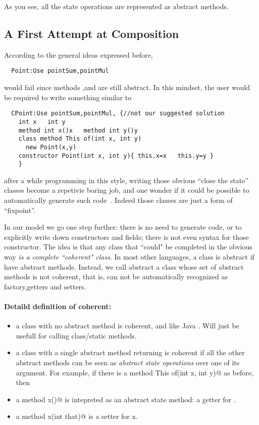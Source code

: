 As you see, all the state operations are represented as abstract methods.

\subsection{A First Attempt at Composition}
According to the general ideas expressed before,
\begin{lstlisting}
  Point:Use pointSum,pointMul
\end{lstlisting}  

\noindent would fail since methods \Q@x@,\Q@y@ and \Q@of@ are still abstract.
In this mindset, the user would be required to write something similar to

\begin{lstlisting}
  CPoint:Use pointSum,pointMul, {//not our suggested solution
    int x   int y
    method int x()x   method int y()y
    class method This of(int x, int y)
      new Point(x,y)
    constructor Point(int x, int y){ this.x=x   this.y=y }
    }
\end{lstlisting}

\noindent after a while programming in this style, 
writing those obvious ``close the state'' classes become a
repetivie boring job, and one wonder
if it could be possible to automatically generate such code~\cite{wang2016classless}.
Indeed those classes are just a form of ``fixpoint''.

In our model we go one step further: there is no need to generate code, or to explicitly
write down constructors and fields; there is not even syntax for those
constructor.
The idea is that any class that ``could" be completed in the obvious way
\emph{is a complete ``coherent" class}.
In most other languages, a class is abstract if have abstract methods.
Instead, we call abstract a class whose set of abstract methods is not
coherent, that is, can not be automatically recognized as factory,getters and setters.
  
\paragraph*{Detaild definition of coherent:}
\begin{itemize}
\item a class with no abstract method is coherent, and like Java \Q@Math@.
Will just be usefull for calling class/static methods.
\item a class with a single abstract \Q@class@ method returning \Q@This@
is coherent if all the other abstract methods can be seen as \emph{abstract state
operations} over one of its argument.
For example,
if there is a \Q@class method This of(int x, int y)@ as before,
then
\item a method \Q@int x()@ is intepreted as an abstract state method: a getter for \Q@x@.
\item a method \Q@Void x(int that)@ is a setter for x.
\end{itemize}

